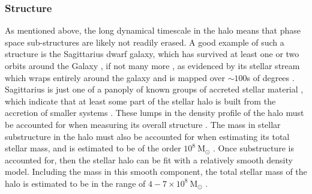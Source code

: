 \subsubsection{Structure}
As mentioned above, the long dynamical timescale in the halo means that phase space sub-structures are likely not readily erased. A good example of such a structure is the Sagittarius dwarf galaxy, which has survived at least one or two orbits around the Galaxy \citep[e.g.]{1999AJ....118.1719J}, if not many more \citep[e.g.][]{1997AJ....113..634I}, as evidenced by its stellar stream which wraps entirely around the galaxy and is mapped over $\sim 100$s of degrees \citep[e.g.][]{2003ApJ...596L.191N,2004AJ....128..245M,2006ApJ...642L.137B,2009ApJ...700.1282Y}. Sagittarius is just one of a panoply of known groups of accreted stellar material \citep[see e.g.][for a review]{2013NewAR..57..100B}, which indicate that at least some part of the stellar halo is built from the accretion of smaller systems \citep[as predicted in the seminal work of][which I discuss further in Section \ref{sec:galacticarchaeology}]{1978ApJ...225..357S}. These lumps in the density profile of the halo must be accounted for when measuring its overall structure \citep[e.g.][]{2011MNRAS.416.2903D}. The mass in stellar substructure in the halo must also be accounted for when estimating its total stellar mass, and is estimated to be of the order $10^8\ \mathrm{M_{\odot}}$ \citep[based on a recent review by][]{2016ARA&A..54..529B}. Once substructure is accounted for, then the stellar halo can be fit with a relatively smooth density model. Including the mass in this smooth component, the total stellar mass of the halo is estimated to be in the range of $4-7\times 10^{8}\ \mathrm{M_{\odot}}$ \citep{2016ARA&A..54..529B}.

